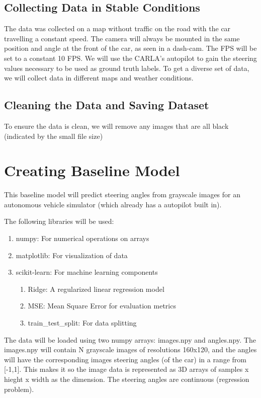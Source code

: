 \documentclass{article} %
\begin{document}
\subsection{Collecting Data in Stable Conditions}

The data was collected on a map without traffic on the road with the car travelling a constant speed. The camera will always be mounted in the same position and angle at
the front of the car, as seen in a dash-cam. The FPS will be set to a constant 10 FPS.
We will use the CARLA's autopilot to gain the steering values necessary to be used as ground truth labels. To get a diverse
set of data, we will collect data in different maps and weather conditions.


\subsection{Cleaning the Data and Saving Dataset}

To ensure the data is clean, we will remove any images that are all black (indicated by the small file size)




 
\section{Creating Baseline Model}

This baseline model will predict steering angles from grayscale images for an autonomous
vehicle simulator (which already has a autopilot built in). 

The following libraries will be used:
\begin{enumerate}
  \item numpy: For numerical operations on arrays
  \item matplotlib: For visualization of data
  \item scikit-learn: For machine learning components
  \begin{enumerate}
    \item Ridge: A regularized linear regression model
    \item MSE: Mean Square Error for evaluation metrics
    \item train\_test\_split: For data splitting
  \end{enumerate}
\end{enumerate}

The data will be loaded using two numpy arrays: images.npy and angles.npy. The images.npy
will contain N grayscale images of resolutions 160x120, and the angles will have the corresponding
images steering angles (of the car) in a range from [-1,1]. This makes it so the image data is 
represented as 3D arrays of samples x hieght x width as the dimension. The steering angles are
continuous (regression problem). 
\end{document}
